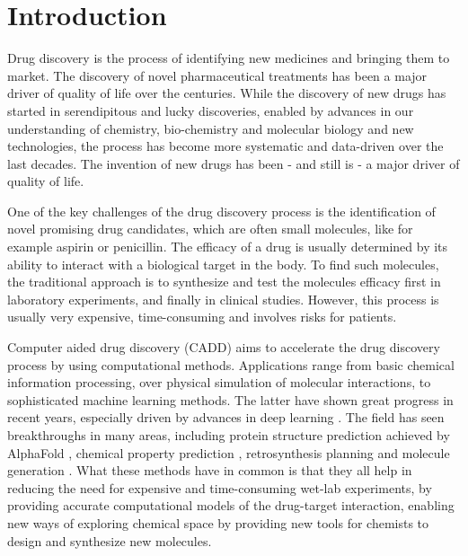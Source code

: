 \chapter{Introduction\label{chap:introduction}}
Drug discovery is the process of identifying new medicines and bringing them to
market. The discovery of novel pharmaceutical treatments has been a major driver
of quality of life over the centuries. While the discovery of new drugs has started 
in serendipitous and lucky discoveries, enabled by advances in our understanding of 
chemistry, bio-chemistry and molecular biology and new technologies, the process has
become more systematic and data-driven over the last decades. The invention of 
new drugs has been - and still is - a major driver of quality of life.

One of the key challenges of the drug discovery process is the identification
of novel promising drug candidates, which are often small molecules, like for example 
aspirin or penicillin. The efficacy of a drug is usually determined by its ability
to interact with a biological target in the body. To find such molecules,
the traditional approach is to synthesize and test the molecules efficacy first in laboratory
experiments, and finally in clinical studies. However, this process is usually very expensive, time-consuming
and involves risks for patients.

Computer aided drug discovery (CADD) aims to accelerate the drug discovery process
by using computational methods. Applications range from basic chemical information 
processing, over physical simulation of molecular interactions, to sophisticated 
machine learning methods. The latter have shown great progress in recent years,
especially driven by advances in deep learning \citep{todo}. The field has seen 
breakthroughs in many areas, including protein structure prediction achieved by AlphaFold \citep{todo}, 
chemical property prediction \citep{mayrDeepToxToxicityPrediction2016,todo}, retrosynthesis planning \citep{seglerNeuralSymbolicMachineLearning2017} and
molecule generation \citep{todo}. What these methods have in common is that they
all help in reducing the need for expensive and time-consuming wet-lab experiments, 
by providing accurate computational models of the drug-target interaction, enabling 
new ways of exploring chemical space by providing new tools for chemists to
design and synthesize new molecules.


